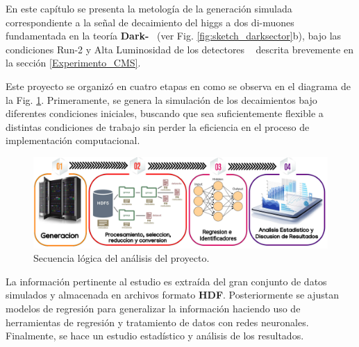 %

En este capítulo se presenta la metología de la generación simulada correspondiente a la señal de decaimiento del higgs a dos di-muones fundamentada en la teoría \textbf{Dark-}\SUSY~ (ver Fig. \ref{fig:sketch_darksector}b), bajo las condiciones Run-2 y Alta Luminosidad de los detectores \CMS ~ descrita brevemente en la sección \ref{Experimento_CMS}. 

Este proyecto se organizó en cuatro etapas en como se observa en el diagrama de la Fig. \ref{procesos_darksusy}. Primeramente, se genera la simulación de los decaimientos bajo diferentes condiciones iniciales, buscando que sea suficientemente flexible a distintas condiciones de trabajo sin perder la eficiencia en el proceso de implementación computacional.
\begin{figure}[!b]
\centering
\includegraphics[width=1\textwidth]{Cap3/imagenes/procesos_darksusy.png}
\caption{Secuencia lógica del análisis del proyecto.}
\label{procesos_darksusy}
\end{figure}
La información pertinente al estudio es extraída del gran conjunto de datos simulados y almacenada en archivos formato \textbf{HDF}. Posteriormente se ajustan modelos de regresión para generalizar la información haciendo uso de herramientas de regresión y tratamiento de datos con redes neuronales. Finalmente, se hace un estudio estadístico y análisis de los resultados.



